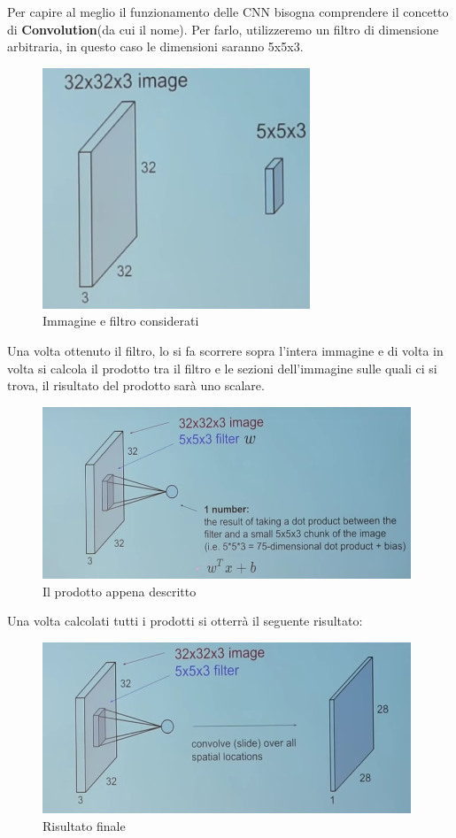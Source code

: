 Per capire al meglio il funzionamento delle \acf{CNN} bisogna comprendere il concetto di \textbf{Convolution}(da cui il nome). Per farlo, utilizzeremo un filtro di dimensione arbitraria, in questo caso le dimensioni saranno 5x5x3.\newline
\begin{figure}[h!]
	\centering
	\includegraphics[width=80mm]{img/3/cnn_1_1}
	\caption{\fontsize{10px}{0mm}\selectfont Immagine e filtro considerati \label{fig:cnn_1_1}}
\end{figure}
\newpage
Una volta ottenuto il filtro, lo si fa scorrere sopra l'intera immagine e di volta in volta si calcola il prodotto tra il filtro e le sezioni dell'immagine sulle quali ci si trova, il risultato del prodotto sarà uno scalare.
\begin{figure}[h!]
	\centering
	\includegraphics[width=110mm]{img/3/cnn_1_2}
	\caption{\fontsize{10px}{0mm}\selectfont Il prodotto appena descritto \label{fig:cnn_1_2}}
\end{figure}
\newline
Una volta calcolati tutti i prodotti si otterrà il seguente risultato:
\begin{figure}[h!]
	\centering
	\includegraphics[width=110mm]{img/3/cnn_1_3}
	\caption{\fontsize{10px}{0mm}\selectfont Risultato finale \label{fig:cnn_1_3}}
\end{figure}
